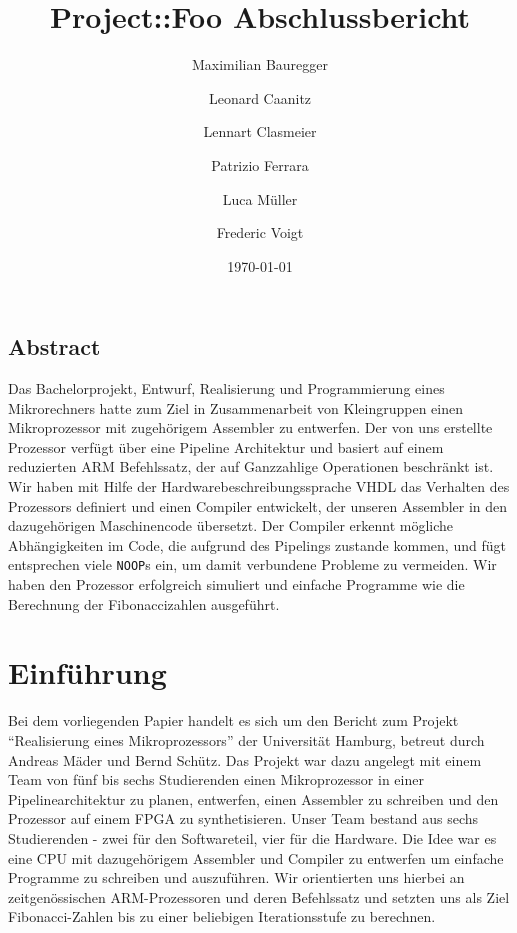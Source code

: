 \documentclass[paper=a4,fontsize=12pt,twocolumn]{scrreprt}
\title{Project::Foo Abschlussbericht}
\author{Maximilian Bauregger \and Leonard Caanitz \and Lennart Clasmeier \and Patrizio Ferrara \and Luca Müller \and Frederic Voigt}
\date{\today}
\begin{document}
\maketitle

\tableofcontents

\section*{Abstract}
Das Bachelorprojekt, Entwurf, Realisierung und Programmierung eines Mikrorechners hatte zum Ziel in Zusammenarbeit von Kleingruppen einen Mikroprozessor mit zugehörigem Assembler zu entwerfen.
Der von uns erstellte Prozessor verfügt über eine Pipeline Architektur und basiert auf einem reduzierten ARM Befehlssatz, der auf Ganzzahlige Operationen beschränkt ist.
Wir haben mit Hilfe der Hardwarebeschreibungssprache VHDL das Verhalten des Prozessors definiert und einen Compiler entwickelt, der unseren Assembler in den dazugehörigen Maschinencode übersetzt.
Der Compiler erkennt mögliche Abhängigkeiten im Code, die aufgrund des Pipelings zustande kommen, und fügt entsprechen viele \texttt{NOOP}s ein, um damit verbundene Probleme zu vermeiden.
Wir haben den Prozessor erfolgreich simuliert und einfache Programme wie die Berechnung der Fibonaccizahlen ausgeführt.


\chapter{Einführung}
Bei dem vorliegenden Papier handelt es sich um den Bericht zum Projekt \enquote{Realisierung eines Mikroprozessors} der Universität Hamburg, betreut durch Andreas Mäder und Bernd Schütz.
Das Projekt war dazu angelegt mit einem Team von fünf bis sechs Studierenden einen Mikroprozessor in einer Pipelinearchitektur zu planen, entwerfen, einen Assembler zu schreiben und den Prozessor auf einem FPGA zu synthetisieren.
Unser Team bestand aus sechs Studierenden - zwei für den Softwareteil, vier für die Hardware.
Die Idee war es eine CPU mit dazugehörigem Assembler und Compiler zu entwerfen um einfache Programme zu schreiben und auszuführen.
Wir orientierten uns hierbei an zeitgenössischen ARM-Prozessoren und deren Befehlssatz und setzten uns als Ziel Fibonacci-Zahlen bis zu einer beliebigen Iterationsstufe zu berechnen.
\end{document}
